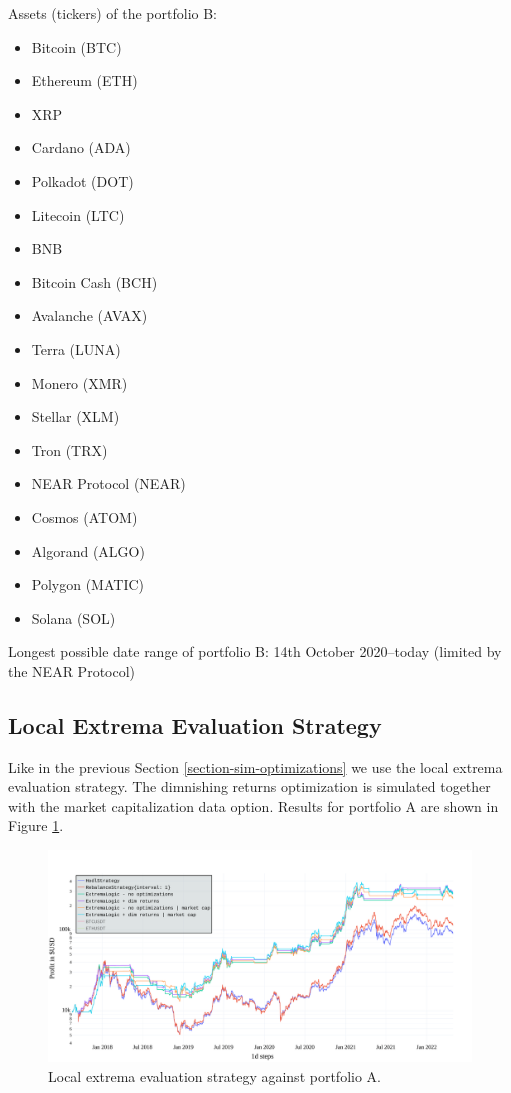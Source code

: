 Assets (tickers) of the portfolio B:
\begin{itemize}
    \item Bitcoin (BTC)
    \item Ethereum (ETH)
    \item XRP
    \item Cardano (ADA)
    \item Polkadot (DOT)
    \item Litecoin (LTC)
    \item BNB
    \item Bitcoin Cash (BCH)
    \item Avalanche (AVAX)
    \item Terra (LUNA)
    \item Monero (XMR)
    \item Stellar (XLM)
    \item Tron (TRX)
    \item NEAR Protocol (NEAR)
    \item Cosmos (ATOM)
    \item Algorand (ALGO)
    \item Polygon (MATIC)
    \item Solana (SOL)

\end{itemize}
Longest possible date range of portfolio B: 14th October 2020--today (limited by the NEAR Protocol)

\subsection*{Local Extrema Evaluation Strategy}
Like in the previous Section \ref{section-sim-optimizations} we use the local extrema evaluation strategy. The dimnishing returns optimization is simulated together with the market capitalization data option. Results for portfolio A are shown in Figure \ref{figure-extrema-portfolio-A}.

\begin{figure}[!hbt]
    \centering
    \includegraphics[width=\columnwidth]{figures/extrema-portfolio-A.pdf}
    \caption{Local extrema evaluation strategy against portfolio A.}
    \label{figure-extrema-portfolio-A}
\end{figure}

